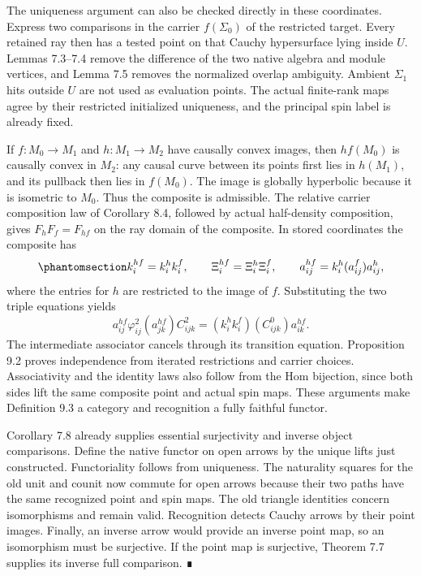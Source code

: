 \documentclass[
  english,
  11pt,
  reqno]{amsart}
\begin{document}
The uniqueness argument can also be checked directly in these
coordinates. Express two comparisons in the carrier \(f(\Sigma_0)\) of
the restricted target. Every retained ray then has a tested point on
that Cauchy hypersurface lying inside \(U\). Lemmas 7.3--7.4 remove the
difference of the two native algebra and module vertices, and Lemma 7.5
removes the normalized overlap ambiguity. Ambient \(\Sigma_1\) hits
outside \(U\) are not used as evaluation points. The actual finite-rank
maps agree by their restricted initialized uniqueness, and the principal
spin label is already fixed.

If \(f:M_0\to M_1\) and \(h:M_1\to M_2\) have causally convex images,
then \(hf(M_0)\) is causally convex in \(M_2\): any causal curve between
its points first lies in \(h(M_1)\), and its pullback then lies in
\(f(M_0)\). The image is globally hyperbolic because it is isometric to
\(M_0\). Thus the composite is admissible. The relative carrier
composition law of Corollary 8.4, followed by actual half-density
composition, gives \(F_hF_f=F_{hf}\) on the ray domain of the composite.
In stored coordinates the composite has
\begin{equation}\protect\phantomsection\label{eq:global-open-stored-composition}{
k_i^{hf}=k_i^h k_i^f,
\qquad
\Xi_i^{hf}=\Xi_i^h\Xi_i^f,
\qquad
a_{ij}^{hf}=k_i^h(a_{ij}^f)a_{ij}^h,
}\end{equation} where the entries for \(h\) are restricted to the image
of \(f\). Substituting the two triple equations yields \[
a_{ij}^{hf}\varphi^2_{ij}(a_{jk}^{hf})C^2_{ijk}
 =(k_i^h k_i^f)(C^0_{ijk})a_{ik}^{hf}.
\] The intermediate associator cancels through its transition equation.
Proposition 9.2 proves independence from iterated restrictions and
carrier choices. Associativity and the identity laws also follow from
the Hom bijection, since both sides lift the same composite point and
actual spin maps. These arguments make Definition 9.3 a category and
recognition a fully faithful functor.

Corollary 7.8 already supplies essential surjectivity and inverse object
comparisons. Define the native functor on open arrows by the unique
lifts just constructed. Functoriality follows from uniqueness. The
naturality squares for the old unit and counit now commute for open
arrows because their two paths have the same recognized point and spin
maps. The old triangle identities concern isomorphisms and remain valid.
Recognition detects Cauchy arrows by their point images. Finally, an
inverse arrow would provide an inverse point map, so an isomorphism must
be surjective. If the point map is surjective, Theorem 7.7 supplies its
inverse full comparison. ∎
\end{document}
